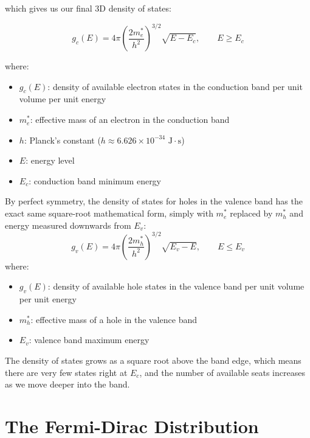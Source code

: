 which gives us our final 3D density of states:
\begin{keyresult}
    \begin{equation}
        g_c(E) = 4\pi\!\left(\frac{2m^*_e}{h^2}\right)^{\!3/2}\!\sqrt{E - E_c}, \qquad E \geq E_c
    \end{equation}
\end{keyresult}
where:
\begin{itemize}
    \item $g_c(E)$: density of available electron states in the conduction band per unit volume per unit energy
    \item $m^*_e$: effective mass of an electron in the conduction band
    \item $h$: Planck's constant ($h \approx 6.626 \times 10^{-34}\text{ J}\cdot\text{s}$)
    \item $E$: energy level
    \item $E_c$: conduction band minimum energy
\end{itemize}

By perfect symmetry, the density of states for holes in the valence band has the exact same square-root mathematical form, simply with $m^*_e$ replaced by $m^*_h$ and energy measured downwards from $E_v$:
\begin{equation*}
    g_v(E) = 4\pi\!\left(\frac{2m^*_h}{h^2}\right)^{\!3/2}\!\sqrt{E_v - E}, \qquad E \leq E_v
\end{equation*}
where:
\begin{itemize}
    \item $g_v(E)$: density of available hole states in the valence band per unit volume per unit energy
    \item $m^*_h$: effective mass of a hole in the valence band
    \item $E_v$: valence band maximum energy
\end{itemize}

The density of states grows as a square root above the band edge, which means there are very few states right at $E_c$, and the number of available seats increases as we move deeper into the band.

\section{The Fermi-Dirac Distribution}

